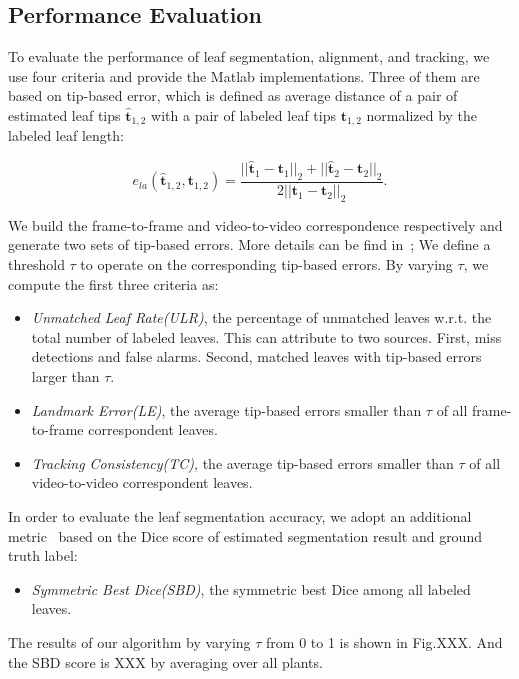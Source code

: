 \subsection{Performance Evaluation}
To evaluate the performance of leaf segmentation, alignment, and tracking, we use four criteria and provide the Matlab implementations.
Three of them are based on tip-based error, which is defined as average distance of a pair of estimated leaf tips $\hat{\bm{t}}_{1,2}$ with a pair of labeled leaf tips $ \bm{t}_{1,2}$ normalized by the labeled leaf length:

\begin {equation}
e_{la}(\hat{\bm{t}}_{1,2}, \bm{t}_{1,2}) = \frac{||\hat{\bm{t}}_1-{\bm{t}}_1||_2 + ||\hat{\bm{t}}_2-{\bm{t}}_2||_2}{2 ||\bm{t}_1-\bm{t}_2||_2}.
\label{eqn:tipError}
\end{equation}

We build the frame-to-frame and video-to-video correspondence respectively and generate two sets of tip-based errors.
More details can be find in~\cite{};
We define a threshold $\tau$ to operate on the corresponding tip-based errors. 
By varying $\tau$, we compute the first three criteria as:
\begin{itemize}
  \item {\it{Unmatched Leaf Rate(ULR)}}, the percentage of unmatched leaves w.r.t. the total number of labeled leaves. This can attribute to two sources. First, miss detections and false alarms. Second, matched leaves with tip-based errors larger than $\tau$.
  \item {\it{Landmark Error(LE)}}, the average tip-based errors smaller than $\tau$ of all frame-to-frame correspondent leaves.
  \item {\it{Tracking Consistency(TC)}}, the average tip-based errors smaller than $\tau$ of all video-to-video correspondent leaves. 
\end{itemize}

In order to evaluate the leaf segmentation accuracy, we adopt an additional metric~\cite{scharr2014annotated} based on the Dice score of estimated segmentation result and ground truth label:
\begin{itemize}
  \item {\it{Symmetric Best Dice(SBD)}}, the symmetric best Dice among all labeled leaves.
\end{itemize}

The results of our algorithm by varying $\tau$ from 0 to 1 is shown in Fig.XXX.
And the SBD score is XXX by averaging over all plants. 






